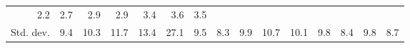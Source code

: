 \begin{tabular}{lllllllllllllll}
  \multicolumn{1}{r}{2.2} &
  \multicolumn{1}{r}{2.7} &
  \multicolumn{1}{r}{2.9} &
  \multicolumn{1}{r}{2.9} &
  \multicolumn{1}{r}{3.4} &
  \multicolumn{1}{r}{3.6} &
  \multicolumn{1}{r}{3.5} \\
\multicolumn{1}{l}{\hspace{2em}Std. dev.} &
  \multicolumn{1}{|r}{9.4} &
  \multicolumn{1}{r}{10.3} &
  \multicolumn{1}{r}{11.7} &
  \multicolumn{1}{r}{13.4} &
  \multicolumn{1}{r}{27.1} &
  \multicolumn{1}{r}{9.5} &
  \multicolumn{1}{r}{8.3} &
  \multicolumn{1}{r}{9.9} &
  \multicolumn{1}{r}{10.7} &
  \multicolumn{1}{r}{10.1} &
  \multicolumn{1}{r}{9.8} &
  \multicolumn{1}{r}{8.4} &
  \multicolumn{1}{r}{9.8} &
  \multicolumn{1}{r}{8.7} \\
\cline{1-15}
\end{tabular}
